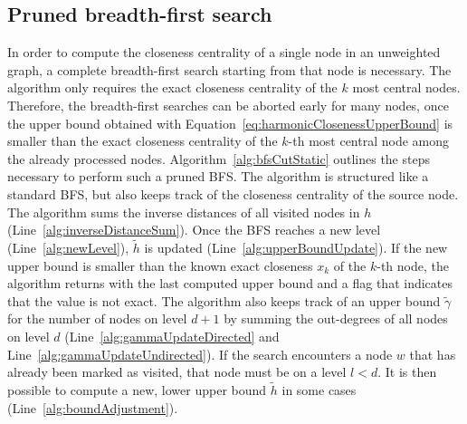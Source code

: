 \subsection{Pruned breadth-first search}
In order to compute the closeness centrality of a single node in an unweighted graph, a complete breadth-first search starting from that node is necessary. The algorithm only requires the exact closeness centrality of the $k$ most central nodes. Therefore, the breadth-first searches can be aborted early for many nodes, once the upper bound obtained with Equation~\ref{eq:harmonicClosenessUpperBound} is smaller than the exact closeness centrality of the $k$-th most central node among the already processed nodes. Algorithm~\ref{alg:bfsCutStatic} outlines the steps necessary to perform such a pruned BFS. The algorithm is structured like a standard BFS, but also keeps track of the closeness centrality of the source node. The algorithm sums the inverse distances of all visited nodes in $h$ (Line~\ref{alg:inverseDistanceSum}). Once the BFS reaches a new level (Line~\ref{alg:newLevel}), $\widetilde{h}$ is updated (Line~\ref{alg:upperBoundUpdate}). If the new upper bound is smaller than the known exact closeness $x_k$ of the $k$-th node, the algorithm returns with the last computed upper bound and a flag that indicates that the value is not exact. The algorithm also keeps track of an upper bound $\widetilde{\gamma}$ for the number of nodes on level $d + 1$ by summing the out-degrees of all nodes on level $d$ (Line~\ref{alg:gammaUpdateDirected} and Line~\ref{alg:gammaUpdateUndirected}). If the search encounters a node $w$ that has already been marked as visited, that node must be on a level $l < d$. It is then possible to compute a new, lower upper bound $\widetilde{h}$ in some cases (Line~\ref{alg:boundAdjustment}).


